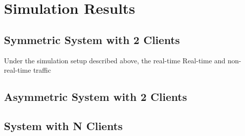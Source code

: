 \documentclass{article}
\begin{document}
\section{Simulation Results}
\label{section: simulation}
\subsection{Symmetric System with 2 Clients}
Under the simulation setup described above, the real-time 
Real-time and non-real-time traffic
\subsection{Asymmetric System with 2 Clients}

\subsection{System with N Clients}
\end{document}
